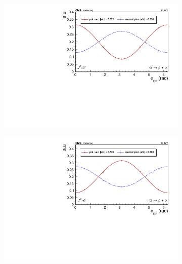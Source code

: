 \begin{figure}[]
  \begin{subfigure}[b]{0.5\linewidth}
    \centering
    \includegraphics[width=\linewidth]{Chapitre6/Images/RHORHO/RHORHO_even_gen.pdf} 
    \caption*{} 
    \vspace{10mm}
  \end{subfigure}%
  \begin{subfigure}[b]{0.5\linewidth}
    \centering
    \includegraphics[width=\linewidth]{Chapitre6/Images/RHORHO/RHORHO_odd_gen.pdf} 
    \caption*{} 
    \vspace{10mm}
  \end{subfigure} 


\end{figure}
